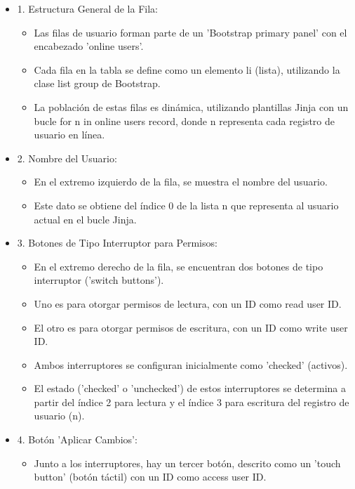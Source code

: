 \documentclass{report}
\begin{document}
\begin{itemize}
    \item 1. Estructura General de la Fila:
        \begin{itemize}
            \item Las filas de usuario forman parte de un 'Bootstrap primary panel' con el encabezado 'online users'.
            \item Cada fila en la tabla se define como un elemento li (lista), utilizando la clase list group de Bootstrap.
            \item La población de estas filas es dinámica, utilizando plantillas Jinja con un bucle for n in online users record, 
            donde n representa cada registro de usuario en línea.
        \end{itemize}
    \item 2. Nombre del Usuario:
        \begin{itemize}
            \item En el extremo izquierdo de la fila, se muestra el nombre del usuario.
            \item Este dato se obtiene del índice 0 de la lista n que representa al usuario actual en el bucle Jinja.
        \end{itemize}
    \item 3. Botones de Tipo Interruptor para Permisos:
        \begin{itemize}
            \item En el extremo derecho de la fila, se encuentran dos botones de tipo interruptor ('switch buttons').
            \item Uno es para otorgar permisos de lectura, con un ID como read user ID.
            \item El otro es para otorgar permisos de escritura, con un ID como write user ID.
            \item Ambos interruptores se configuran inicialmente como 'checked' (activos).
            \item El estado ('checked' o 'unchecked') de estos interruptores se determina a partir del índice 2 para lectura y el índice 3 
            para escritura del registro de usuario (n).
        \end{itemize}
    \item 4. Botón 'Aplicar Cambios':
        \begin{itemize}
            \item Junto a los interruptores, hay un tercer botón, descrito como un 'touch button' (botón táctil) con un ID como access user ID.

\end{itemize}
\end{itemize}
\end{document}
